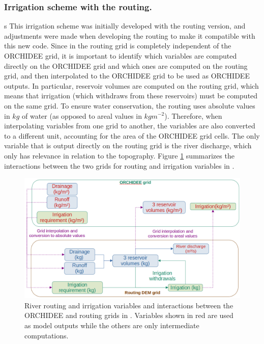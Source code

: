 \subsubsection{Irrigation scheme with the \native routing.}
s
This irrigation scheme was initially developed with the \std routing version, and adjustments were made when developing the \native routing to make it compatible with this new code. Since in \native the routing grid is completely independent of the ORCHIDEE grid, it is important to identify which variables are computed directly on the ORCHIDEE grid and which ones are computed on the routing grid, and then interpolated to the ORCHIDEE grid to be used as ORCHIDEE outputs.
In particular, reservoir volumes are computed on the routing grid, which means that irrigation (which withdraws from these reservoirs) must be computed on the same grid.
To ensure water conservation, the \native routing uses absolute values in $kg$ of water (as opposed to areal values in $kg m^{-2}$). Therefore, when interpolating variables from one grid to another, the variables are also converted to a different unit, accounting for the area of the ORCHIDEE grid cells.
The only variable that is output directly on the routing grid is the river discharge, which only has relevance in relation to the topography. Figure \ref{fig:irrig_interpolations_outputvars} summarizes the interactions between the two grids for routing and irrigation variables in \native.

\begin{figure}[htbp]
    \centering
    \includegraphics[width=\textwidth]{images/methods/routing_irrig_interpolation_outputvars.png}
    \caption{River routing and irrigation variables and interactions between the ORCHIDEE and routing grids in \native. Variables shown in red are used as model outputs while the others are only intermediate computations.}
    \label{fig:irrig_interpolations_outputvars}
\end{figure}

